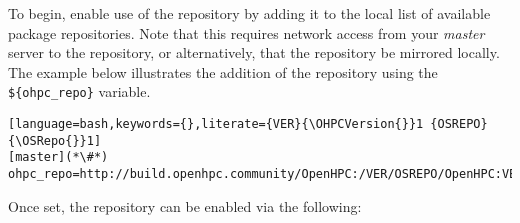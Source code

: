 To begin, enable use of the \OHPC{} repository by adding it to the local list of
available package repositories.  Note that this requires network access from
your {\em master} server to the \OHPC{} repository, or alternatively, that
the \OHPC{} repository be mirrored locally. The example below illustrates the addition
of the \OHPC{} repository using the \texttt{\$\{ohpc\_repo\}}
variable.

\begin{lstlisting}[language=bash,keywords={},literate={VER}{\OHPCVersion{}}1 {OSREPO}{\OSRepo{}}1]
[master](*\#*) ohpc_repo=http://build.openhpc.community/OpenHPC:/VER/OSREPO/OpenHPC:VER.repo
\end{lstlisting}

Once set, the repository can be enabled via the following: 







